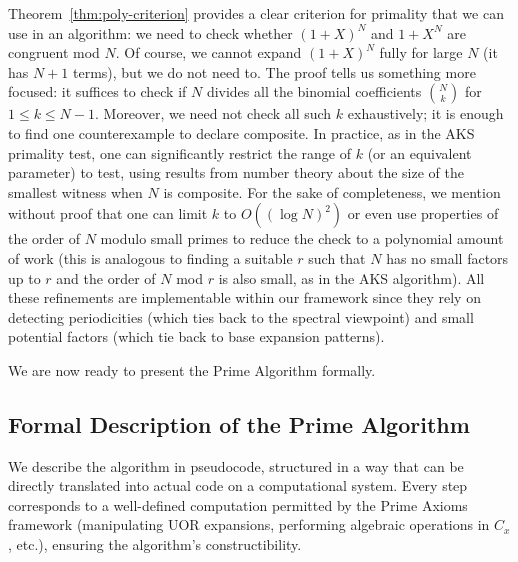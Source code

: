 \documentclass[11pt]{article}
\begin{document}
{Theorem~\ref{thm:poly-criterion} provides a clear criterion for primality that we can use in an algorithm: we need to check whether $(1+X)^N$ and $1+X^N$ are congruent mod $N$. Of course, we cannot expand $(1+X)^N$ fully for large $N$ (it has $N+1$ terms), but we do not need to. The proof tells us something more focused: it suffices to check if $N$ divides all the binomial coefficients $\binom{N}{k}$ for $1 \le k \le N-1$. Moreover, we need not check all such $k$ exhaustively; it is enough to find one counterexample to declare composite. In practice, as in the AKS primality test, one can significantly restrict the range of $k$ (or an equivalent parameter) to test, using results from number theory about the size of the smallest witness when $N$ is composite. For the sake of completeness, we mention without proof that one can limit $k$ to $O((\log N)^2)$ or even use properties of the order of $N$ modulo small primes to reduce the check to a polynomial amount of work (this is analogous to finding a suitable $r$ such that $N$ has no small factors up to $r$ and the order of $N$ mod $r$ is also small, as in the AKS algorithm). All these refinements are implementable within our framework since they rely on detecting periodicities (which ties back to the spectral viewpoint) and small potential factors (which tie back to base expansion patterns).

We are now ready to present the Prime Algorithm formally.

\subsection{Formal Description of the Prime Algorithm}
We describe the algorithm in pseudocode, structured in a way that can be directly translated into actual code on a computational system. Every step corresponds to a well-defined computation permitted by the Prime Axioms framework (manipulating UOR expansions, performing algebraic operations in $C_x$, etc.), ensuring the algorithm’s constructibility.

}
\end{document}
